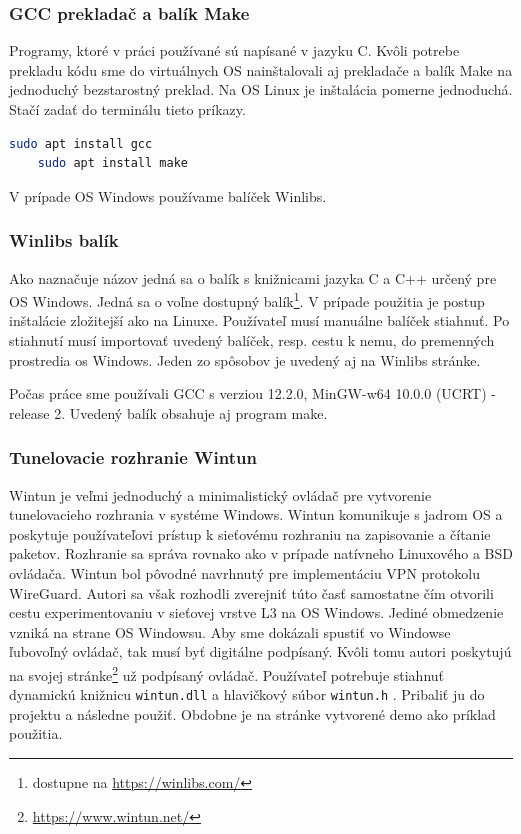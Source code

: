 \subsubsection{GCC prekladač a balík Make \cite{gcc}}
Programy, ktoré v práci používané sú napísané v jazyku C. Kvôli potrebe prekladu kódu sme do virtuálnych OS nainštalovali aj prekladače a balík Make na jednoduchý bezstarostný preklad.
Na OS Linux je inštalácia pomerne jednoduchá. Stačí zadať do terminálu tieto príkazy.
\begin{lstlisting}[language=bash]
	sudo apt install gcc
	sudo apt install make
\end{lstlisting}  
V prípade OS Windows používame balíček Winlibs. 

\subsubsection{Winlibs balík \cite{winlibs}}
Ako naznačuje názov jedná sa o balík s knižnicami jazyka C a C++ určený pre OS Windows. Jedná sa o voľne dostupný balík\footnote{dostupne na \href{https://winlibs.com/}{https://winlibs.com/}}. V prípade použitia je postup inštalácie zložitejší ako na Linuxe. Používateľ musí manuálne balíček stiahnuť. Po stiahnutí musí importovať uvedený balíček, resp. cestu k nemu, do premenných prostredia \acrshort{os} Windows. Jeden zo spôsobov je uvedený aj na Winlibs stránke. 

Počas práce sme používali GCC s verziou 12.2.0, MinGW-w64 10.0.0 (UCRT) - release 2. Uvedený balík obsahuje aj program make.  
\subsubsection{Tunelovacie rozhranie Wintun \cite{wintun}}
Wintun je veľmi jednoduchý a minimalistický ovládač pre vytvorenie tunelovacieho rozhrania v systéme Windows. Wintun komunikuje s jadrom OS a poskytuje používateľovi prístup k sieťovému rozhraniu na zapisovanie a čítanie paketov. Rozhranie sa správa rovnako ako v prípade natívneho Linuxového a BSD ovládača. Wintun bol pôvodné navrhnutý pre implementáciu VPN protokolu WireGuard. Autori sa však rozhodli zverejniť túto časť samostatne čím otvorili cestu experimentovaniu v sieťovej vrstve L3 na OS Windows. Jediné obmedzenie vzniká na strane OS Windowsu. Aby sme dokázali spustiť vo Windowse ľubovoľný ovládač, tak musí byť digitálne podpísaný. Kvôli tomu autori poskytujú na svojej stránke\footnote{\url{https://www.wintun.net/}} už podpísaný ovládač. Používateľ potrebuje stiahnuť dynamickú knižnicu \lstinline|wintun.dll| a hlavičkový súbor \lstinline|wintun.h| . Pribaliť ju do projektu a následne použiť. Obdobne je na stránke vytvorené demo ako príklad použitia. 

